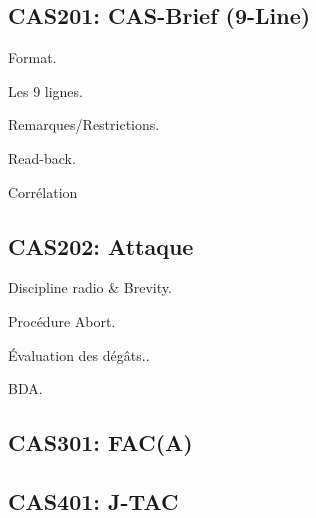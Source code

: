 \begin{onepage}
	
	\section{CAS201: CAS-Brief (9-Line)}
	
	\begin{e1}
		
		\item Format.
		
		\item Les 9 lignes.
		
		\item Remarques/Restrictions.
		
		\item Read-back.
		
		\item Corrélation
		
	\end{e1}
\end{onepage}

\newpage


\begin{onepage}
	
	\section{CAS202: Attaque}
	
	\begin{e1}
		
		\item Discipline radio \& Brevity.
		
		\item Procédure Abort.
		
		\item Évaluation des dégâts..
		
		\item BDA.
		
	\end{e1}
\end{onepage}

\newpage


\begin{onepage}
	
	\section{CAS301: FAC(A)}
	
	
\end{onepage}

\newpage


\begin{onepage}
	
	\section{CAS401: J-TAC}
	
	
\end{onepage}